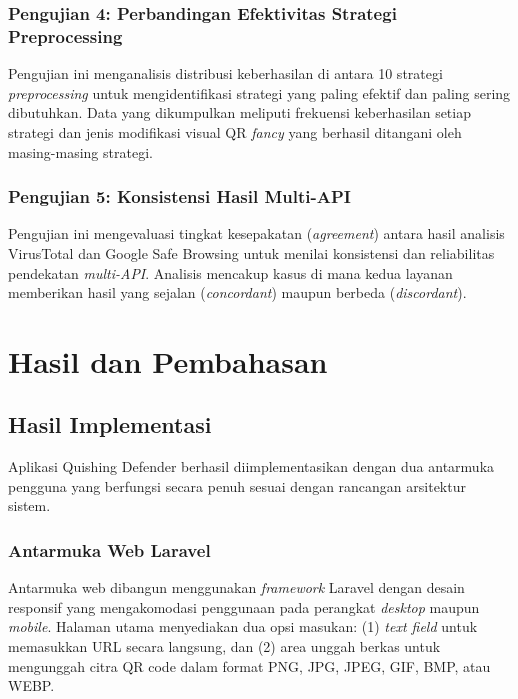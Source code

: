 \documentclass[conference]{IEEEtran}
\begin{document}
\subsubsection{Pengujian 4: Perbandingan Efektivitas Strategi Preprocessing}
Pengujian ini menganalisis distribusi keberhasilan di antara 10 strategi \textit{preprocessing} untuk mengidentifikasi strategi yang paling efektif dan paling sering dibutuhkan. Data yang dikumpulkan meliputi frekuensi keberhasilan setiap strategi dan jenis modifikasi visual QR \textit{fancy} yang berhasil ditangani oleh masing-masing strategi.

\subsubsection{Pengujian 5: Konsistensi Hasil Multi-API}
Pengujian ini mengevaluasi tingkat kesepakatan (\textit{agreement}) antara hasil analisis VirusTotal dan Google Safe Browsing untuk menilai konsistensi dan reliabilitas pendekatan \textit{multi-API}. Analisis mencakup kasus di mana kedua layanan memberikan hasil yang sejalan (\textit{concordant}) maupun berbeda (\textit{discordant}).

\section{Hasil dan Pembahasan}

\subsection{Hasil Implementasi}

Aplikasi Quishing Defender berhasil diimplementasikan dengan dua antarmuka pengguna yang berfungsi secara penuh sesuai dengan rancangan arsitektur sistem.

\subsubsection{Antarmuka Web Laravel}
Antarmuka web dibangun menggunakan \textit{framework} Laravel dengan desain responsif yang mengakomodasi penggunaan pada perangkat \textit{desktop} maupun \textit{mobile}. Halaman utama menyediakan dua opsi masukan: (1) \textit{text field} untuk memasukkan URL secara langsung, dan (2) area unggah berkas untuk mengunggah citra QR code dalam format PNG, JPG, JPEG, GIF, BMP, atau WEBP.
\end{document}
